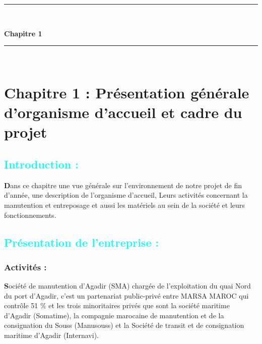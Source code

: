 \documentclass[11pt]{article}
\begin{document}
\newpage

\begin{center}
\vspace*{\fill} %
    {\color{cyan}\rule{\linewidth}{0.5mm}} \\[1.5ex]
    
    {\color{cyan}\Huge\bfseries Chapitre 1\par}
    
    {\color{cyan}\rule{\linewidth}{0.5mm}} \\[2ex]
    \vspace*{\fill} %
\end{center}

\newpage

\section{\textcolor{bleumarine}{Chapitre 1 : Présentation générale d’organisme d’accueil et cadre du projet}}
\vspace{1cm}



\subsection{\textcolor{cyan}{Introduction :}} 

\textbf{D}ans ce chapitre une vue générale sur l’environnement de notre projet de fin d’année, une description de l’organisme d’accueil, Leurs activités concernant la manutention et entreposage et aussi les matériels au sein de la société et leurs fonctionnements.

\subsection{\textcolor{cyan}{Présentation de l’entreprise :} } 
\subsubsection{Activités :} 
\textbf{S}ociété de manutention d’Agadir (SMA) chargée de l’exploitation du quai Nord du port d’Agadir, c’est un partenariat public-privé entre MARSA MAROC qui contrôle 51 \%  et les trois minoritaires privés que sont la société maritime d’Agadir (Somatime), la compagnie marocaine de manutention et de la consignation du Souss (Manusouss) et la Société de transit et de consignation maritime d’Agadir (Internavi).\vspace{0.5cm}
\end{document}
